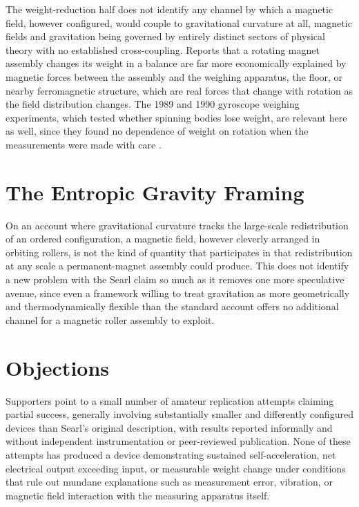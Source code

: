 \documentclass[11pt]{article}
\begin{document}
The weight-reduction half does not identify any channel by which a magnetic field, however configured, would couple to gravitational curvature at all, magnetic fields and gravitation being governed by entirely distinct sectors of physical theory with no established cross-coupling. Reports that a rotating magnet assembly changes its weight in a balance are far more economically explained by magnetic forces between the assembly and the weighing apparatus, the floor, or nearby ferromagnetic structure, which are real forces that change with rotation as the field distribution changes. The 1989 and 1990 gyroscope weighing experiments, which tested whether spinning bodies lose weight, are relevant here as well, since they found no dependence of weight on rotation when the measurements were made with care \cite{QP1990}.

\section{The Entropic Gravity Framing}

On an account where gravitational curvature tracks the large-scale redistribution of an ordered configuration, a magnetic field, however cleverly arranged in orbiting rollers, is not the kind of quantity that participates in that redistribution at any scale a permanent-magnet assembly could produce. This does not identify a new problem with the Searl claim so much as it removes one more speculative avenue, since even a framework willing to treat gravitation as more geometrically and thermodynamically flexible than the standard account offers no additional channel for a magnetic roller assembly to exploit.

\section{Objections}

Supporters point to a small number of amateur replication attempts claiming partial success, generally involving substantially smaller and differently configured devices than Searl's original description, with results reported informally and without independent instrumentation or peer-reviewed publication. None of these attempts has produced a device demonstrating sustained self-acceleration, net electrical output exceeding input, or measurable weight change under conditions that rule out mundane explanations such as measurement error, vibration, or magnetic field interaction with the measuring apparatus itself.
\end{document}
